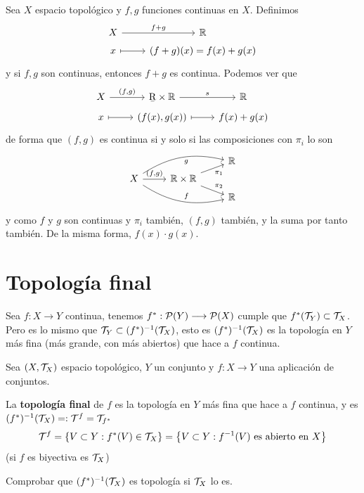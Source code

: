 \begin{ejer}
    Sea $X$ espacio topol\'ogico y $f,g$ funciones continuas en $X$. Definimos
    $$\bt X \rar{f+g} & \bb R \\[-5mm] x \rarmaps & (f+g)(x) = f(x) + g(x) \et$$
    y si $f,g$ son continuas, entonces $f+g$ es continua. Podemos ver que 
    $$\bt X \rar{(f,g)} & \b R \times \bb R \rar{s} & \bb R \\[-5mm]
    x \rarmaps & (f(x),g(x)) \rarmaps & f(x)+g(x)
    \et$$
    de forma que $(f,g)$ es continua si y solo si las composiciones con $\pi_i$ lo son
    $$\bt & & \bb R \\[-5mm] X \arrow[bend left=8mm,swap]{rru}{g}  \arrow[bend right=8mm]{rrd}{f} \rar{(f,g)} & \bb R\times \bb R \arrow[swap]{ru}{\pi_1}\arrow{rd}{\pi_2} \\[-5mm] & & \bb R \et$$
    y como $f$ y $g$ son continuas y $\pi_i$ tambi\'en, $(f,g)$ tambi\'en, y la suma por tanto tambi\'en. De la misma forma, $f(x) \cdot g(x)$. 
\end{ejer}
\section{Topolog\'ia final}
\begin{custom}
    [Motivaci\'on] Sea $f: X \longrightarrow Y$ continua, tenemos $f^*: \mathcal{P}(Y) \longrightarrow \mathcal{P}(X)$ cumple que $f^*(\mathcal{T}_Y) \subset \mathcal{T}_X$. Pero es lo mismo que $\mathcal{T}_Y \subset (f^*)^{-1}(\mathcal{T}_X)$, esto es $(f^*)^{-1}(\mathcal{T}_X)$ es la topolog\'ia en $Y$ m\'as fina (m\'as grande, con m\'as abiertos) que hace a $f$ continua.
\end{custom}
Sea $(X, \mathcal{T}_X)$ espacio topol\'ogico, $Y$ un conjunto y $f: X \longrightarrow Y$ una aplicaci\'on de conjuntos. 
\begin{defi}
    La \textbf{topolog\'ia final} de $f$ es la topolog\'ia en $Y$ m\'as fina que hace a $f$ continua, y es $(f^*)^{-1}(\mathcal{T}_X) =: \mathcal{T}^f=\mathcal{T}_{f^*}$
    $$\mathcal{T}^f = \left\{ V \subset Y : f^*(V) \in \mathcal{T}_X  \right\} =  \left\{ V \subset Y : f^{-1}(V) \text{ es abierto en } X  \right\}$$
    (si $f$ es biyectiva es $\mathcal{T}_X$)
\end{defi}
\begin{ejer}
    Comprobar que $(f^*)^{-1}(\mathcal{T}_X)$ es topolog\'ia si $\mathcal{T}_X$ lo es.
\end{ejer}
